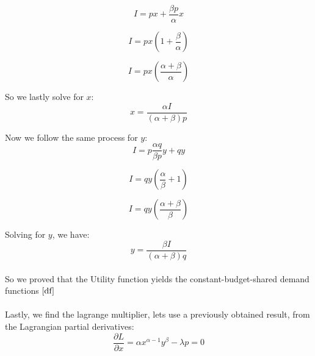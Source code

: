 \documentclass{article}
\begin{document}
  \begin{equation}
    I = px + \frac{\beta p}{\alpha}x
  \end{equation}

  \begin{equation}
    I = px( 1 + \frac{\beta}{\alpha})
  \end{equation}

  \begin{equation}
    I = px \left( \frac{\alpha + \beta}{\alpha} \right)
  \end{equation}

So we lastly solve for $x$:
  \begin{equation}\label{x}
    x = \frac{\alpha I}{(\alpha + \beta)p}
  \end{equation}

\medskip

Now we follow the same process for $y$:
  \begin{equation}
    I = p\frac{\alpha q}{\beta p}y + qy
  \end{equation}

  \begin{equation}
    I = qy \left( \frac{\alpha}{\beta} + 1 \right)
  \end{equation}

  \begin{equation}
    I = qy \left( \frac{\alpha + \beta}{\beta}\right)
  \end{equation}

Solving for $y$, we have:
  \begin{equation}\label{y}
    y = \frac{\beta I}{(\alpha + \beta)q}
  \end{equation}

\medskip

\paragraph{}
So we proved that the Utility function yields the constant-budget-shared demand functions $\ref{df}$

\paragraph{}
Lastly, we find the lagrange multiplier, lets use a previously obtained result, from the Lagrangian partial derivatives:
  \begin{equation}
    \frac{\partial L}{\partial x} = \alpha x^{\alpha - 1} y^\beta - \lambda p = 0
  \end{equation}
\end{document}
